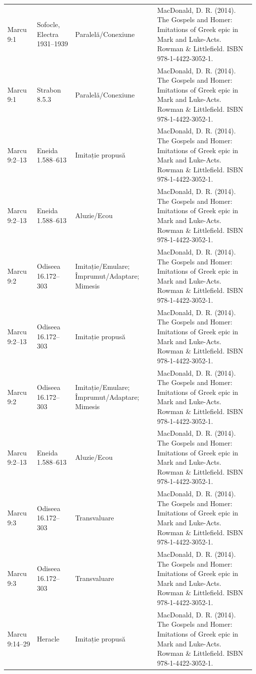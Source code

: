\documentclass[12pt,a4paper,twoside,openany]{book}
\begin{document}
\begin{longtable}{L{1.4cm}L{1.7cm}L{3.1cm}L{8.4cm}}
Marcu 9:1 & Sofocle, Electra 1931–1939 & Paralelă/Conexiune & MacDonald, D. R. (2014). The Gospels and Homer: Imitations of Greek epic in Mark and Luke-Acts. Rowman \& Littlefield. ISBN 978-1-4422-3052-1. \\
Marcu 9:1 & Strabon 8.5.3 & Paralelă/Conexiune & MacDonald, D. R. (2014). The Gospels and Homer: Imitations of Greek epic in Mark and Luke-Acts. Rowman \& Littlefield. ISBN 978-1-4422-3052-1. \\
Marcu 9:2–13 & Eneida 1.588–613 & Imitație propusă & MacDonald, D. R. (2014). The Gospels and Homer: Imitations of Greek epic in Mark and Luke-Acts. Rowman \& Littlefield. ISBN 978-1-4422-3052-1. \\
Marcu 9:2–13 & Eneida 1.588–613 & Aluzie/Ecou & MacDonald, D. R. (2014). The Gospels and Homer: Imitations of Greek epic in Mark and Luke-Acts. Rowman \& Littlefield. ISBN 978-1-4422-3052-1. \\
Marcu 9:2 & Odiseea 16.172–303 & Imitație/Emulare; Împrumut/Adaptare; Mimesis & MacDonald, D. R. (2014). The Gospels and Homer: Imitations of Greek epic in Mark and Luke-Acts. Rowman \& Littlefield. ISBN 978-1-4422-3052-1. \\
Marcu 9:2–13 & Odiseea 16.172–303 & Imitație propusă & MacDonald, D. R. (2014). The Gospels and Homer: Imitations of Greek epic in Mark and Luke-Acts. Rowman \& Littlefield. ISBN 978-1-4422-3052-1. \\
Marcu 9:2 & Odiseea 16.172–303 & Imitație/Emulare; Împrumut/Adaptare; Mimesis & MacDonald, D. R. (2014). The Gospels and Homer: Imitations of Greek epic in Mark and Luke-Acts. Rowman \& Littlefield. ISBN 978-1-4422-3052-1. \\
Marcu 9:2–13 & Eneida 1.588–613 & Aluzie/Ecou & MacDonald, D. R. (2014). The Gospels and Homer: Imitations of Greek epic in Mark and Luke-Acts. Rowman \& Littlefield. ISBN 978-1-4422-3052-1. \\
Marcu 9:3 & Odiseea 16.172–303 & Transvaluare & MacDonald, D. R. (2014). The Gospels and Homer: Imitations of Greek epic in Mark and Luke-Acts. Rowman \& Littlefield. ISBN 978-1-4422-3052-1. \\
Marcu 9:3 & Odiseea 16.172–303 & Transvaluare & MacDonald, D. R. (2014). The Gospels and Homer: Imitations of Greek epic in Mark and Luke-Acts. Rowman \& Littlefield. ISBN 978-1-4422-3052-1. \\
Marcu 9:14–29 & Heracle & Imitație propusă & MacDonald, D. R. (2014). The Gospels and Homer: Imitations of Greek epic in Mark and Luke-Acts. Rowman \& Littlefield. ISBN 978-1-4422-3052-1. \\

\end{longtable}
\end{document}
